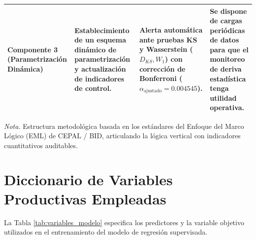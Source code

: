 \begin{table}[htbp]
\begin{tabularx}{\textwidth}{>{\bfseries\raggedright\arraybackslash}p{2.3cm} >{\raggedright\arraybackslash}X >{\raggedright\arraybackslash}p{3.5cm} >{\raggedright\arraybackslash}p{3.4cm}}
\addlinespace
\textbf{Componente 3 (Parametrización Dinámica)} & Establecimiento de un esquema dinámico de parametrización y actualización de indicadores de control. & Alerta automática ante pruebas KS y Wasserstein ($D_{KS}, W_1$) con corrección de Bonferroni ($\alpha_{\text{ajustado}} = 0.004545$). & Se dispone de cargas periódicas de datos para que el monitoreo de deriva estadística tenga utilidad operativa. \\
\bottomrule
\end{tabularx}
\vspace{2mm}
\raggedright\footnotesize
\textit{Nota.} Estructura metodológica basada en los estándares del Enfoque del Marco Lógico (EML) de CEPAL / BID, articulando la lógica vertical con indicadores cuantitativos auditables.
\end{table}

\section{Diccionario de Variables Productivas Empleadas}
\label{anexo:diccionario_variables}

La Tabla \ref{tab:variables_modelo} especifica los predictores y la variable objetivo utilizados en el entrenamiento del modelo de regresión supervisada.

